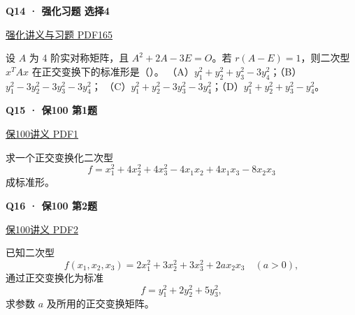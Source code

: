 \documentclass[UTF8,fontset=fandol,11pt,a4paper]{ctexart}
\newcommand{\source}[1]{{\footnotesize\color{Muted}#1\par}}
\newcommand{\qtitle}[2]{\par\needspace{5\baselineskip}\hypertarget{#1}{}\label{#1}\textbf{#2}\par}
\begin{document}
\begin{minipage}{\linewidth}
\qtitle{R-MC-04}{Q14 · 强化习题 选择4}
\source{\href{file:///Users/skyintelligence/Desktop/\%E5\%BE\%97\%E8\%AF\%BB\%E4\%B8\%AA\%E7\%A0\%94-\%E5\%8C\%97\%E5\%A4\%A7\%E8\%BD\%AF\%E5\%BE\%AE/\%E6\%95\%B0\%E5\%AD\%A6\%20150/Kira\%C2\%B727\%E7\%BA\%BF\%E6\%80\%A7\%E4\%BB\%A3\%E6\%95\%B0\%E5\%BC\%BA\%E5\%8C\%96\%E8\%AE\%B2\%E4\%B9\%89\%2B\%E4\%B9\%A0\%E9\%A2\%98.pdf\#page=165}{强化讲义与习题 PDF165}}
设 $A$ 为 4 阶实对称矩阵，且 $A^2+2A-3E=O$。若 $r(A-E)=1$，则二次型 $x^TAx$ 在正交变换下的标准形是（\quad）。
（A）$y_1^2+y_2^2+y_3^2-3y_4^2$；（B）$y_1^2-3y_2^2-3y_3^2-3y_4^2$；
（C）$y_1^2+y_2^2-3y_3^2-3y_4^2$；（D）$y_1^2+y_2^2+y_3^2-y_4^2$。
\end{minipage}\par\vspace{7mm}
\begin{minipage}{\linewidth}
\qtitle{S-01}{Q15 · 保100 第1题}
\source{\href{file:///Users/skyintelligence/Desktop/\%E5\%BE\%97\%E8\%AF\%BB\%E4\%B8\%AA\%E7\%A0\%94-\%E5\%8C\%97\%E5\%A4\%A7\%E8\%BD\%AF\%E5\%BE\%AE/\%E6\%95\%B0\%E5\%AD\%A6\%20150/02\_\%E4\%B8\%93\%E9\%A1\%B9\%E5\%88\%B7\%E9\%A2\%98\_\%E4\%BF\%9D100/\%E7\%BA\%BF\%E6\%80\%A7\%E4\%BB\%A3\%E6\%95\%B0/\%E7\%BA\%BF\%E6\%80\%A7\%E4\%BB\%A3\%E6\%95\%B0\%E4\%B8\%93\%E9\%A1\%B9\%E5\%88\%B7\%E9\%A2\%98\%E8\%AF\%BE14-\%E4\%BA\%8C\%E6\%AC\%A1\%E5\%9E\%8B\%20\%E8\%AE\%B2\%E4\%B9\%89.pdf\#page=1}{保100讲义 PDF1}}
求一个正交变换化二次型\[f=x_1^2+4x_2^2+4x_3^2-4x_1x_2+4x_1x_3-8x_2x_3\]成标准形。
\end{minipage}\par\vspace{7mm}
\begin{minipage}{\linewidth}
\qtitle{S-02}{Q16 · 保100 第2题}
\source{\href{file:///Users/skyintelligence/Desktop/\%E5\%BE\%97\%E8\%AF\%BB\%E4\%B8\%AA\%E7\%A0\%94-\%E5\%8C\%97\%E5\%A4\%A7\%E8\%BD\%AF\%E5\%BE\%AE/\%E6\%95\%B0\%E5\%AD\%A6\%20150/02\_\%E4\%B8\%93\%E9\%A1\%B9\%E5\%88\%B7\%E9\%A2\%98\_\%E4\%BF\%9D100/\%E7\%BA\%BF\%E6\%80\%A7\%E4\%BB\%A3\%E6\%95\%B0/\%E7\%BA\%BF\%E6\%80\%A7\%E4\%BB\%A3\%E6\%95\%B0\%E4\%B8\%93\%E9\%A1\%B9\%E5\%88\%B7\%E9\%A2\%98\%E8\%AF\%BE14-\%E4\%BA\%8C\%E6\%AC\%A1\%E5\%9E\%8B\%20\%E8\%AE\%B2\%E4\%B9\%89.pdf\#page=2}{保100讲义 PDF2}}
已知二次型\[f(x_1,x_2,x_3)=2x_1^2+3x_2^2+3x_3^2+2ax_2x_3\quad(a>0),\]通过正交变换化为标准\[f=y_1^2+2y_2^2+5y_3^2,\]求参数 \(a\) 及所用的正交变换矩阵。
\end{minipage}\par\vspace{7mm}
\end{document}
